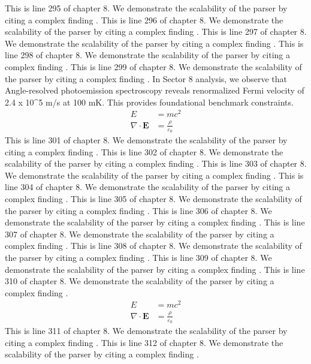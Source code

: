 This is line 295 of chapter 8. We demonstrate the scalability of the parser by citing a complex finding \cite{ref8_295}.
This is line 296 of chapter 8. We demonstrate the scalability of the parser by citing a complex finding \cite{ref8_296}.
This is line 297 of chapter 8. We demonstrate the scalability of the parser by citing a complex finding \cite{ref8_297}.
This is line 298 of chapter 8. We demonstrate the scalability of the parser by citing a complex finding \cite{ref8_298}.
This is line 299 of chapter 8. We demonstrate the scalability of the parser by citing a complex finding \cite{ref8_299}.
In Sector 8 analysis, we observe that Angle-resolved photoemission spectroscopy reveals renormalized Fermi velocity of 2.4 x 10^5 m/s at 100 mK. This provides foundational benchmark constraints.
\begin{align*}
  E &= mc^2 \\
  \nabla \cdot \mathbf{E} &= \frac{\rho}{\varepsilon_0}
\end{align*}
This is line 301 of chapter 8. We demonstrate the scalability of the parser by citing a complex finding \cite{ref8_301}.
This is line 302 of chapter 8. We demonstrate the scalability of the parser by citing a complex finding \cite{ref8_302}.
This is line 303 of chapter 8. We demonstrate the scalability of the parser by citing a complex finding \cite{ref8_303}.
This is line 304 of chapter 8. We demonstrate the scalability of the parser by citing a complex finding \cite{ref8_304}.
This is line 305 of chapter 8. We demonstrate the scalability of the parser by citing a complex finding \cite{ref8_305}.
This is line 306 of chapter 8. We demonstrate the scalability of the parser by citing a complex finding \cite{ref8_306}.
This is line 307 of chapter 8. We demonstrate the scalability of the parser by citing a complex finding \cite{ref8_307}.
This is line 308 of chapter 8. We demonstrate the scalability of the parser by citing a complex finding \cite{ref8_308}.
This is line 309 of chapter 8. We demonstrate the scalability of the parser by citing a complex finding \cite{ref8_309}.
This is line 310 of chapter 8. We demonstrate the scalability of the parser by citing a complex finding \cite{ref8_310}.
\begin{align*}
  E &= mc^2 \\
  \nabla \cdot \mathbf{E} &= \frac{\rho}{\varepsilon_0}
\end{align*}
This is line 311 of chapter 8. We demonstrate the scalability of the parser by citing a complex finding \cite{ref8_311}.
This is line 312 of chapter 8. We demonstrate the scalability of the parser by citing a complex finding \cite{ref8_312}.
